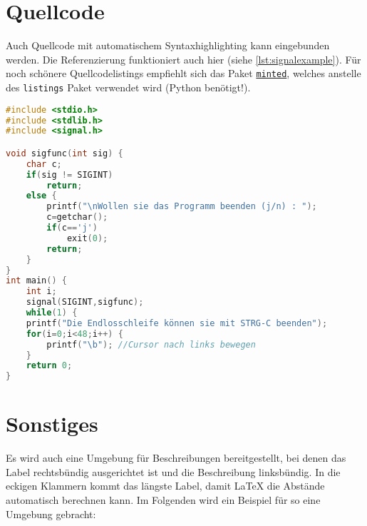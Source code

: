 \section{Quellcode}
Auch Quellcode mit automatischem Syntaxhighlighting kann eingebunden werden. Die Referenzierung funktioniert auch hier (siehe \autoref{lst:signalexample}). Für noch schönere Quellcodelistings empfiehlt sich das Paket \href{https://ctan.org/pkg/minted?lang=de}{\texttt{minted}}, welches anstelle des \texttt{listings} Paket verwendet wird (Python benötigt!).
\begin{lstlisting}[language=c,caption={[Ein einfaches Quellcodelisting]Ein einfaches Quellcodelisting~\cite{wolf_LinuxsystemprogrammierenCKurs_2003}},label=lst:signalexample]
#include <stdio.h>
#include <stdlib.h>
#include <signal.h>

void sigfunc(int sig) {
	char c;
	if(sig != SIGINT)
		return;
	else {
		printf("\nWollen sie das Programm beenden (j/n) : ");
		c=getchar();
		if(c=='j')
			exit(0);
		return;
	}
}
int main() {
	int i;
	signal(SIGINT,sigfunc);
	while(1) {
	printf("Die Endlosschleife können sie mit STRG-C beenden");
	for(i=0;i<48;i++) {
		printf("\b"); //Cursor nach links bewegen
	}
	return 0;
}
\end{lstlisting}

\section{Sonstiges}
Es wird auch eine Umgebung für Beschreibungen bereitgestellt, bei denen das Label rechtsbündig ausgerichtet ist und die Beschreibung linksbündig. In die eckigen Klammern kommt das längste Label, damit \LaTeX{} die Abstände automatisch berechnen kann. Im Folgenden wird ein Beispiel für so eine Umgebung gebracht:


